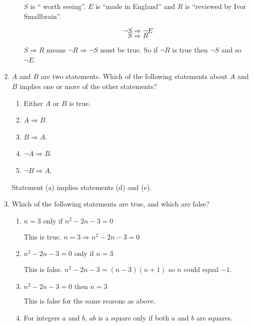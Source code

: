 \documentclass{article}
\begin{document}
\begin{enumerate}
\begin{enumerate}
				$S$ is `` worth seeing''. $E$ is ``made in England'' and $R$ is ``reviewed by Ivor Smallbrain''.
				
				$$\neg S \Rightarrow \neg E$$
				$$S \Rightarrow R$$
				
				$S \Rightarrow R$ means $\neg R \Rightarrow \neg S$ must be true. So if $\neg R$ is true then $\neg S$
				and so $\neg E$.
		\end{enumerate}
		
		\item $A$ and $B$ are two statements. Which of the following statements about $A$ and $B$ implies one or
			more of the other statements?
			
			\begin{enumerate}
				\item Either $A$ or $B$ is true.
				
				\item $A \Rightarrow B$.
				
				\item $B \Rightarrow A$.
				
				\item $\neg A \Rightarrow B$.
				
				\item $\neg B \Rightarrow A$.
			\end{enumerate}
			
			Statement (a) implies statements (d) and (e).
			
		\item Which of the following statements are true, and which are false?
	
		\begin{enumerate}
		
			\item $n = 3 \text{ only if } n^2 - 2n - 3 = 0$
			
				This is true. $n = 3 \Rightarrow n^2 - 2n - 3 = 0$
				
			\item $n^2 - 2n - 3 = 0 \text{ only if } n = 3$
			
				This is false. $n^2 - 2n - 3 = (n - 3)(n + 1)$ so $n$ could equal $-1$.
				
			\item $n^2 -2n -3 = 0 \text{ then } n =3$
			
				This is false for the same reasons as above.
				
			\item For integers $a$ and $b$, $ab$ is a square only if both $a$ and $b$ are squares.
			

\end{enumerate}
\end{enumerate}
\end{document}

